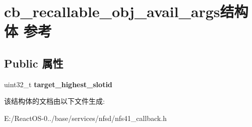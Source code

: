 \hypertarget{structcb__recallable__obj__avail__args}{}\section{cb\+\_\+recallable\+\_\+obj\+\_\+avail\+\_\+args结构体 参考}
\label{structcb__recallable__obj__avail__args}
\subsection*{Public 属性}
\begin{DoxyCompactItemize}
\item 
\mbox{\label{structcb__recallable__obj__avail__args_abbfb0a374fabd11798af2eca66e10047}} 
uint32\+\_\+t {\bfseries target\+\_\+highest\+\_\+slotid}
\end{DoxyCompactItemize}


该结构体的文档由以下文件生成\+:\begin{DoxyCompactItemize}
\item 
E\+:/\+React\+O\+S-\/0../base/services/nfsd/nfs41\+\_\+callback.\+h\end{DoxyCompactItemize}
